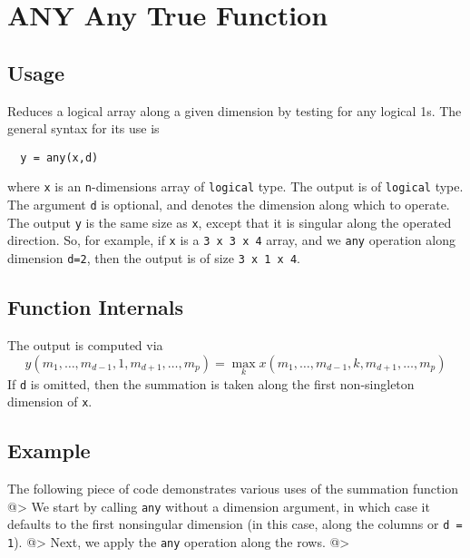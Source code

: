 \section{ANY Any True Function}

\subsection{Usage}

Reduces a logical array along a given dimension by testing for any
logical 1s.  The general 
syntax for its use is
\begin{verbatim}
  y = any(x,d)
\end{verbatim}
where \verb|x| is an \verb|n|-dimensions array of \verb|logical| type.
The output is of \verb|logical| type.  The argument \verb|d| is 
optional, and denotes the dimension along which to operate.
The output \verb|y| is the same size as \verb|x|, except that it is 
singular along the operated direction.  So, for example,
if \verb|x| is a \verb|3 x 3 x 4| array, and we \verb|any| operation along
dimension \verb|d=2|, then the output is of size \verb|3 x 1 x 4|.
\subsection{Function Internals}

The output is computed via
\[
y(m_1,\ldots,m_{d-1},1,m_{d+1},\ldots,m_{p}) = 
\max_{k} x(m_1,\ldots,m_{d-1},k,m_{d+1},\ldots,m_{p})
\]
If \verb|d| is omitted, then the summation is taken along the 
first non-singleton dimension of \verb|x|. 
\subsection{Example}

The following piece of code demonstrates various uses of the summation
function
@>
We start by calling \verb|any| without a dimension argument, in which 
case it defaults to the first nonsingular dimension (in this case, 
along the columns or \verb|d = 1|).
@>
Next, we apply the \verb|any| operation along the rows.
@>
